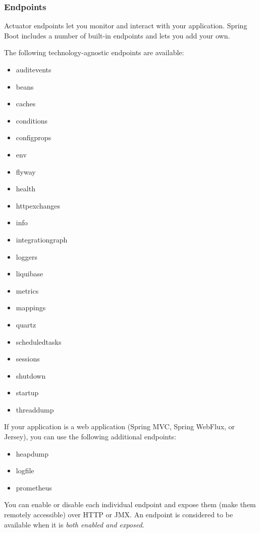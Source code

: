 \documentclass{scrartcl}
\begin{document}
\subsubsection{Endpoints}

Actuator endpoints let you monitor and interact with your application. Spring Boot includes a number of built-in endpoints and lets you add your own.

The following technology-agnostic endpoints are available:

\begin{itemize}
    \item auditevents
    \item beans
    \item caches
    \item conditions
    \item configprops
    \item env
    \item flyway
    \item health
    \item httpexchanges
    \item info
    \item integrationgraph
    \item loggers
    \item liquibase
    \item metrics
    \item mappings
    \item quartz
    \item scheduledtasks
    \item sessions
    \item shutdown
    \item startup
    \item threaddump
\end{itemize}

If your application is a web application (Spring MVC, Spring WebFlux, or Jersey), you can use the following additional endpoints:

\begin{itemize}
    \item heapdump
    \item logfile
    \item prometheus
\end{itemize}

You can enable or disable each individual endpoint and expose them (make them remotely accessible) over HTTP or JMX. An endpoint is considered to be available when it is \textit{both enabled and exposed}.
\end{document}
